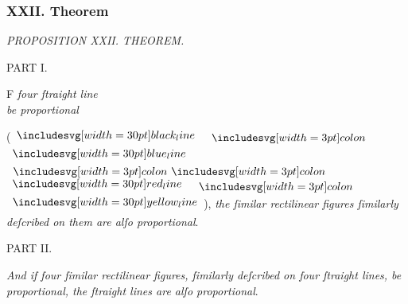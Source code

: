 \documentclass[11pt,preview]{standalone}
\begin{document}
\subsubsection{XXII. Theorem}

\begin{minipage}[t]{0.54\textwidth}
    \begin{center}
        \textit{PROPOSITION XXII. THEOREM.}\label{book6pr22} \\
    \end{center}

    \hfill

    \begin{center}
        PART I.\\
        \raggedright \lettrine[lines=3, loversize=1, nindent=0pt]{}{}F \textit{four ſtraight line\\ be proportional}
    \end{center}
    \vspace{3ex}
    \raggedright  (\hspace{-1ex}$\blackline$ $\bcolon$ $\blueline$ $\bbcolon$ $\redline$ $\bcolon$ $\yellowline$\hspace{-1ex}), \textit{the ſimilar rectilinear figures ſimilarly deſcribed on them are alſo proportional}.

    \hfill

    \begin{center}
        PART II.\\
        \vspace{1ex}
        \raggedright \textit{And if four ſimilar rectilinear figures, ſimilarly deſcribed on four ſtraight lines, be proportional, the ſtraight lines are alſo proportional}.
    \end{center}
\end{minipage}%
\hfill
\begin{minipage}[t]{0.43\textwidth}
    \vspace{40pt}
    
\end{minipage}%

\hfill

\hfill
\end{document}
